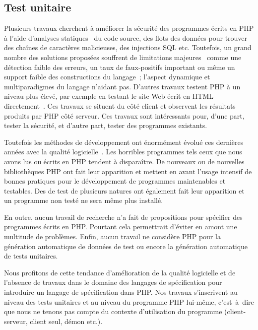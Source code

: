 \subsection{Test unitaire}

Plusieurs travaux cherchent à améliorer la sécurité des programmes écrits en PHP
à l'aide d'analyses statiques~ du code source, des flots des données pour trouver des
chaînes de caractères malicieuses, des injections SQL etc. Toutefois, un grand
nombre des solutions proposées souffrent de limitations
majeures~ comme une détection faible des erreurs, un taux de
faux-positifs important ou même un support faible des constructions du langage~;
l'aspect dynamique et multiparadigmes du langage n'aidant pas. D'autres travaux
testent PHP à un niveau plus élevé, par exemple en testant le site Web écrit en
HTML directement~.
Ces travaux se situent du côté client et observent les résultats produits par
PHP côté serveur. Ces travaux sont intéressants pour, d'une part, tester la
sécurité, et d'autre part, tester des programmes existants.

Toutefois les méthodes de développement ont énormément évolué ces dernières
années avec la qualité logicielle~. Les horribles programmes
tels ceux que nous avons lus ou écrits en PHP tendent à disparaître. De nouveaux
 ou de nouvelles bibliothèques PHP ont fait leur
apparition et mettent en avant l'usage intensif de bonnes pratiques pour le
développement de programmes maintenables et testables. Des
 de test de plusieurs natures ont également fait leur
apparition et un programme non testé ne sera même plus installé. 

En outre, aucun travail de recherche n'a fait de propositions pour spécifier des
programmes écrits en PHP. Pourtant cela permettrait d'éviter en amont une
multitude de problèmes. Enfin, aucun travail ne considère PHP pour la génération
automatique de données de test ou encore la génération automatique de tests
unitaires.

Nous profitons de cette tendance d'amélioration de la qualité logicielle et de
l'absence de travaux dans le domaine des langages de spécification pour
introduire un langage de spécification dans PHP. Nos travaux s'inscrivent au
niveau des tests unitaires et au niveau du programme PHP lui-même, c'est~à~dire
que nous ne tenons pas compte du contexte d'utilisation du programme
(client-serveur, client seul, démon etc.).

